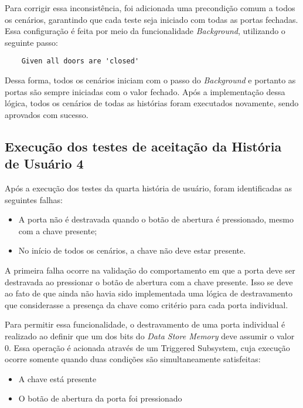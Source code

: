 Para corrigir essa inconsistência, foi adicionada uma precondição comum a todos os cenários, garantindo que cada teste seja iniciado com todas as portas fechadas. Essa 
configuração é feita por meio da funcionalidade \textit{Background}, utilizando o seguinte passo:

\begin{verbatim}
	Given all doors are 'closed'
\end{verbatim}

Dessa forma, todos os cenários iniciam com o passo do \textit{Background} e portanto as portas são sempre iniciadas com o valor fechado. Após a implementação dessa 
lógica, todos os cenários de todas as histórias foram executados novamente, sendo aprovados com sucesso.


\subsection{Execução dos testes de aceitação da História de Usuário 4}

Após a execução dos testes da quarta história de usuário, foram identificadas as seguintes falhas:

\begin{itemize}
	\item A porta não é destravada quando o botão de abertura é pressionado, mesmo com a chave presente;
	\item No início de todos os cenários, a chave não deve estar presente.
\end{itemize}

A primeira falha ocorre na validação do comportamento em que a porta deve ser destravada ao pressionar o botão de abertura com a chave presente. Isso se deve ao fato 
de que ainda não havia sido implementada uma lógica de destravamento que considerasse a presença da chave como critério para cada porta individual.

Para permitir essa funcionalidade, o destravamento de uma porta individual é realizado ao definir que um dos bits do \textit{Data Store Memory} deve assumir o valor 0. 
Essa operação é acionada através de um Triggered Subsystem, cuja execução ocorre somente quando duas condições são simultaneamente satisfeitas:

\begin{itemize}
	\item A chave está presente
	\item O botão de abertura da porta foi pressionado
\end{itemize}

